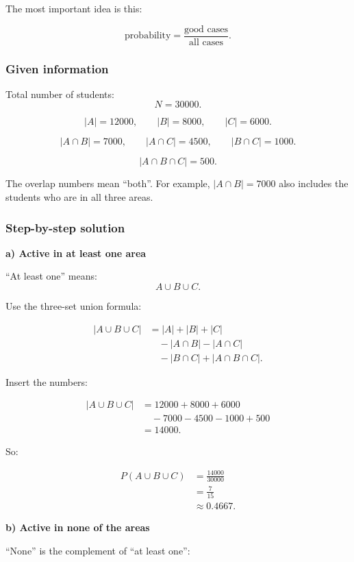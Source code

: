 \documentclass[10pt]{article}
\begin{document}
The most important idea is this:

\[
\text{probability}
=
\frac{\text{good cases}}{\text{all cases}}.
\]

\subsubsection*{Given information}

Total number of students:
\[
N=30000.
\]

\[
|A|=12000,\qquad |B|=8000,\qquad |C|=6000.
\]

\[
|A\cap B|=7000,\qquad |A\cap C|=4500,\qquad |B\cap C|=1000.
\]

\[
|A\cap B\cap C|=500.
\]

The overlap numbers mean ``both''. For example,
\(|A\cap B|=7000\) also includes the students who are in all three
areas.

\subsubsection*{Step-by-step solution}

\textbf{a) Active in at least one area}

``At least one'' means:
\[
A\cup B\cup C.
\]

Use the three-set union formula:

\begin{align*}
|A\cup B\cup C|
&=
|A|+|B|+|C| \\
&\quad
-|A\cap B|-|A\cap C| \\
&\quad
-|B\cap C|+|A\cap B\cap C|.
\end{align*}

Insert the numbers:

\begin{align*}
|A\cup B\cup C|
&=
12000+8000+6000 \\
&\quad
-7000-4500-1000+500 \\
&=14000.
\end{align*}

So:

\begin{align*}
P(A\cup B\cup C)
&=
\frac{14000}{30000} \\[1mm]
&=
\frac{7}{15} \\[1mm]
&\approx 0.4667.
\end{align*}

\textbf{b) Active in none of the areas}

``None'' is the complement of ``at least one'':
\end{document}

